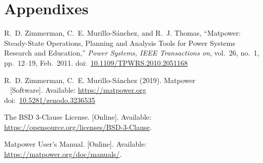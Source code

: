 \documentclass[12pt,a4paper]{book}
\newcommand{\matpower}[0]{{\sc Matpower}}
\newcommand{\doi}[1]{doi:~\href{https://doi.org/#1}{#1}}
\begin{document}
	
	\tableofcontents                            
	\listoffigures
	\listoftables	
	
	
	
	
	\part*{Appendixes}
	
	
	
	\clearpage
	\begin{thebibliography}{99}
	R.~D. Zimmerman, C.~E. Murillo-S{\'a}nchez, and R.~J. Thomas, ``\matpower{}: Steady-State Operations, Planning and Analysis Tools for Power Systems Research and Education,'' \emph{Power Systems, IEEE Transactions on}, vol.~26, no.~1, pp.~12--19, Feb.~2011.
	\doi{10.1109/TPWRS.2010.2051168}
	
	R.~D. Zimmerman, C.~E. Murillo-S{\'a}nchez (2019). \matpower{}\\~
	[Software]. Available: \url{https://matpower.org}\\
	\doi{10.5281/zenodo.3236535}
	
	The BSD 3-Clause License. [Online]. Available: \url{https://opensource.org/licenses/BSD-3-Clause}.
	
	\matpower{} User's Manual. [Online]. Available: \url{https://matpower.org/doc/manuals/}.
		
    \end{thebibliography}
	
\end{document}
